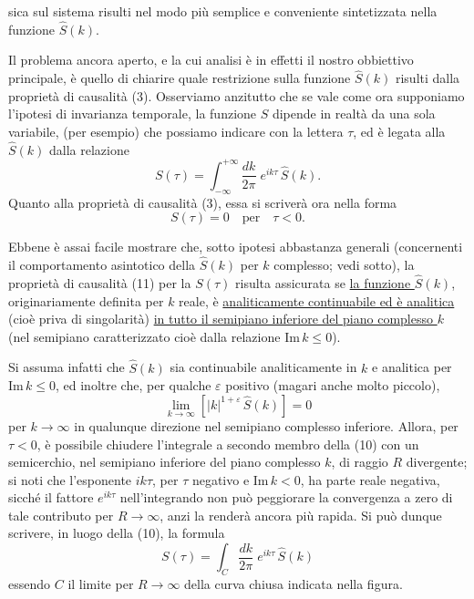 \documentclass[11pt, a4paper]{book}
\numberwithin{equation}{section}
\begin{document}

sica sul sistema risulti nel modo più semplice e conveniente sintetizzata nella
funzione $\hat{S}(k)$.

Il problema ancora aperto, e la cui analisi è in effetti il nostro
obbiettivo principale, è quello di chiarire quale restrizione sulla funzione
$\hat{S}(k)$ risulti dalla proprietà di causalità (3). Osserviamo anzitutto che
se vale come ora supponiamo l'ipotesi di invarianza temporale, la funzione $S$
dipende in realtà da una sola variabile, (per esempio) che possiamo indicare
con la lettera $\tau$, ed è legata alla $\hat{S}(k)$ dalla relazione
\begin{equation}
    S(\tau) = \int_{-\infty}^{+\infty} \frac{dk}{2\pi}\; e^{ik\tau}\,\hat{S}(k). \tag{10}
\end{equation}
Quanto alla proprietà di causalità (3), essa si scriverà ora nella forma
\begin{equation}
    S(\tau) = 0 \quad \text{per} \quad \tau < 0. \tag{11}
\end{equation}

Ebbene è assai facile mostrare che, sotto ipotesi abbastanza generali
(concernenti il comportamento asintotico della $\hat{S}(k)$ per $k$ complesso;
vedi sotto), la proprietà di causalità (11) per la $S(\tau)$ risulta assicurata
se \uline{la funzione $\hat{S}(k)$}, originariamente definita per $k$ reale, è
\uline{analiticamente continuabile ed è analitica} (cioè priva di singolarità)
\uline{in tutto il semipiano inferiore del piano complesso $k$} (nel semipiano
caratterizzato cioè dalla relazione $\mathrm{Im}\, k \leq 0$).

\medskip
Si assuma infatti che $\hat{S}(k)$ sia continuabile analiticamente in $k$
e analitica per $\mathrm{Im}\, k \leq 0$, ed inoltre che, per qualche $\varepsilon$
positivo (magari anche molto piccolo),
\[
    \lim_{k \to \infty} \left[|k|^{1+\varepsilon}\,\hat{S}(k)\right] = 0
\]
per $k \to \infty$ in qualunque direzione nel semipiano complesso inferiore.
Allora, per $\tau < 0$, è possibile chiudere l'integrale a secondo membro della
(10) con un semicerchio, nel semipiano inferiore del piano complesso $k$, di
raggio $R$ divergente; si noti che l'esponente $ik\tau$, per $\tau$ negativo e
$\mathrm{Im}\, k < 0$, ha parte reale negativa, sicché il fattore $e^{ik\tau}$
nell'integrando non può peggiorare la convergenza a zero di tale contributo per
$R \to \infty$, anzi la renderà ancora più rapida.
Si può dunque scrivere, in luogo della (10), la formula
\[
    S(\tau) = \int_C \frac{dk}{2\pi}\; e^{ik\tau}\,\hat{S}(k)
\]
essendo $C$ il limite per $R \to \infty$ della curva chiusa indicata nella figura.
\end{document}
